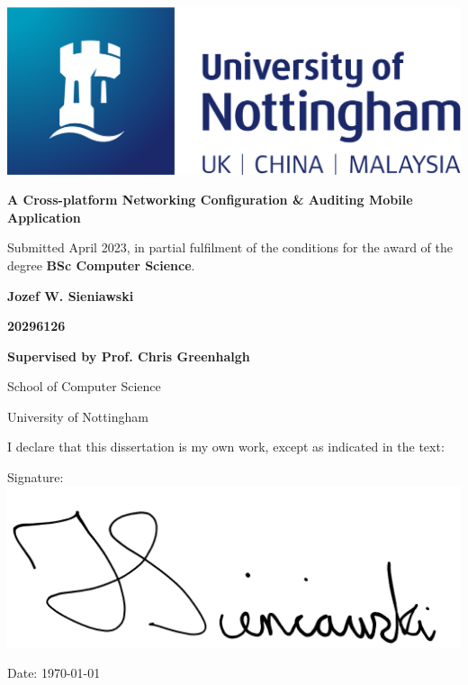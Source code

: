 \documentclass [11pt,a4paper]{article}
\begin{document}
 
\thispagestyle{empty}
\begin{center}
    \centering
    \includegraphics[width=0.5\linewidth]{images/nottingham-logo.png}
    \vspace{2.5cm}
    {\Large \par}
    {\LARGE \textbf{A Cross-platform Networking Configuration \& Auditing Mobile Application}\par}
    \vspace{1.5cm}
    {\small Submitted April 2023, in partial fulfilment of \break the conditions for the award of the degree \textbf{BSc Computer Science}.\par}

    \vspace{1cm}
    {\Large \textbf{Jozef W. Sieniawski}\par}
    {\textbf{20296126}\par}
    \vspace{1cm}
    {\normalsize \textbf{Supervised by Prof. Chris Greenhalgh}\par}
    \vspace{1cm}
    {\normalsize School of Computer Science\par}
    {\normalsize University of Nottingham\par}
    \vspace{2cm}

    {\normalsize I declare that this dissertation is my own work, except as indicated in the text:\par}
    \vspace{1cm}
    {\normalsize Signature: \underline{ \includegraphics[width=0.25\linewidth]{images/signature.png}}\par}
    \vspace{0.25cm}
    {\normalsize Date: \today\par}
\end{center}

\pagebreak
{}    
\end{document}
